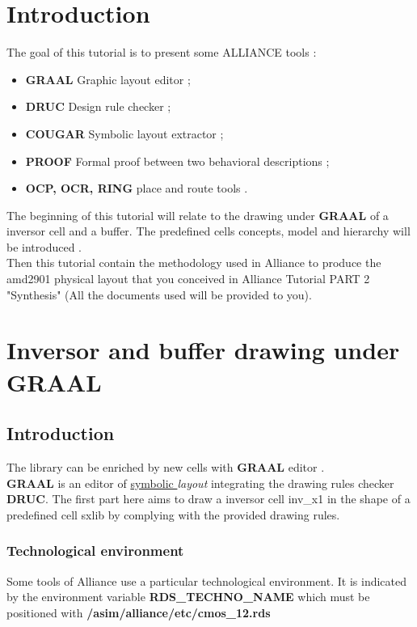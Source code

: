 \documentclass[12pt]{article}
\begin{document}
\newpage

\section{Introduction}
 The goal of this tutorial is to present some ALLIANCE tools :
\begin{itemize}\itemsep=-.4ex
\item   {\bf GRAAL} Graphic layout editor ;
\item   {\bf DRUC} Design rule checker ;
\item   {\bf COUGAR} Symbolic layout extractor ;
\item   {\bf PROOF} Formal proof between two behavioral descriptions ;
\item   {\bf OCP, OCR, RING} place and route tools .
\end{itemize}

The beginning of this tutorial will relate to the drawing under {
\bf GRAAL } of a inversor cell and a buffer.
The predefined cells concepts, model and
hierarchy will be introduced .\\
Then this tutorial contain the methodology used in Alliance to produce
the amd2901 physical layout that you conceived in Alliance Tutorial 
PART 2 "Synthesis" (All the documents used will be provided to you).
 
\newpage

\section{Inversor and buffer drawing under GRAAL}

\subsection{Introduction}
    The library can be enriched by new cells with {\bf GRAAL} editor .\\
{ \bf GRAAL } is an editor of \/{\underline{symbolic }} {\it
layout} integrating the drawing rules checker {\bf DRUC}. The
first part here aims to draw a inversor cell inv\_x1 in the shape
of a predefined cell sxlib  by complying with the provided
drawing rules.

\subsubsection{Technological environment}
Some tools of Alliance use a particular technological
environment. It is indicated by the environment variable {\bf
RDS\_TECHNO\_NAME} which must be positioned with
{\bf/asim/alliance/etc/cmos\_12.rds}
\end{document}
